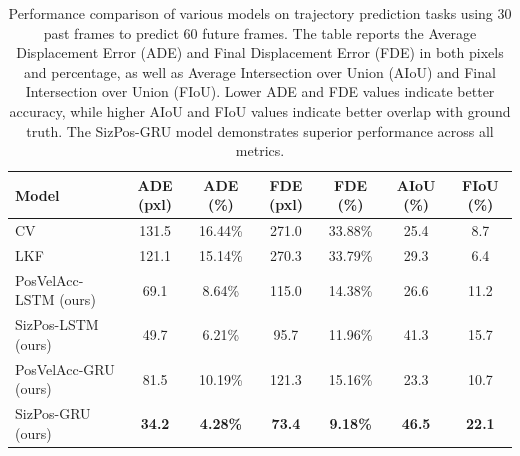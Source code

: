 \documentclass[12pt,oneside]{book} %
\begin{document}
\begin{table}[H]
    \centering
    \caption{Performance comparison of various models on trajectory prediction tasks using 30 past frames to predict 60 future frames. The table reports the Average Displacement Error (ADE) and Final Displacement Error (FDE) in both pixels and percentage, as well as Average Intersection over Union (AIoU) and Final Intersection over Union (FIoU). Lower ADE and FDE values indicate better accuracy, while higher AIoU and FIoU values indicate better overlap with ground truth. The SizPos-GRU model demonstrates superior performance across all metrics.}
    \begin{adjustbox}{max width=\textwidth}
        \begin{tabular}{lcccccc}
            \toprule
            \textbf{Model}        & \textbf{ADE (pxl)} & \textbf{ADE (\%)} & \textbf{FDE (pxl)} & \textbf{FDE (\%)} & \textbf{AIoU (\%)} & \textbf{FIoU (\%)} \\ 
            \midrule
            CV                    & 131.5              & 16.44\%           & 271.0              & 33.88\%           & 25.4               & 8.7                \\
            LKF                   & 121.1              & 15.14\%           & 270.3              & 33.79\%           & 29.3               & 6.4                \\
            PosVelAcc-LSTM (ours) & 69.1               & 8.64\%            & 115.0              & 14.38\%           & 26.6               & 11.2               \\
            SizPos-LSTM (ours)    & 49.7               & 6.21\%            & 95.7               & 11.96\%           & 41.3               & 15.7               \\
            PosVelAcc-GRU (ours)  & 81.5               & 10.19\%           & 121.3              & 15.16\%           & 23.3               & 10.7               \\
            SizPos-GRU (ours)     & \textbf{34.2}      & \textbf{4.28\%}   & \textbf{73.4}      & \textbf{9.18\%}   & \textbf{46.5}      & \textbf{22.1}      \\
            \bottomrule
        \end{tabular}
    \end{adjustbox}
    \label{tab:fusion-gru-results-60frames}
\end{table}
\end{document}
